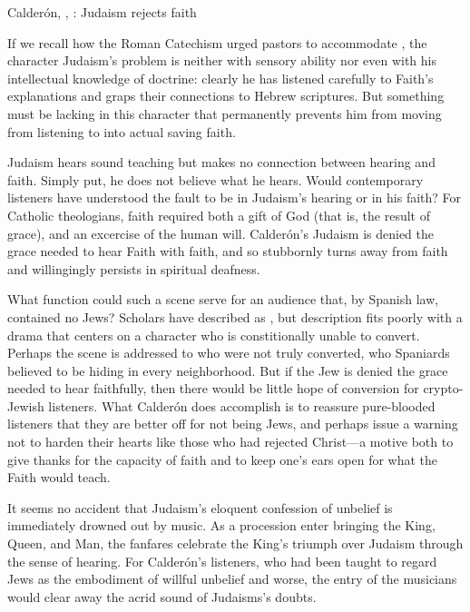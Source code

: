 \begin{expoem}
\caption{Calderón, , : Judaism rejects faith}
\label{expoem:Calderon-Retiro-Judaismo}
\end{expoem}

If we recall how the Roman Catechism urged pastors to accommodate , the character Judaism's problem is neither with sensory ability nor even with his intellectual knowledge of doctrine: clearly he has listened carefully to Faith's explanations and graps their connections to Hebrew scriptures.
But something must be lacking in this character that permanently prevents him from moving from listening to  into actual saving faith.

Judaism hears sound teaching but makes no connection between hearing and faith. 
Simply put, he does not believe what he hears.
Would contemporary listeners have understood the fault to be in Judaism's hearing or in his faith?
For Catholic theologians, faith required both a gift of God (that is, the result of grace), and an excercise of the human will.\citXXX{}
Calderón's Judaism is denied the grace needed to hear Faith with faith, and so stubbornly turns away from faith and willingingly persists in spiritual deafness.

What function could such a scene serve for an audience that, by Spanish law, contained no Jews?
Scholars have described  as \citXXX[Wardropper?], but description fits poorly with a drama that centers on a character who is constitionally unable to convert.
Perhaps the scene is addressed to  who were not truly converted, who Spaniards believed to be hiding in every neighborhood.
But if the Jew is denied the grace needed to hear faithfully, then there would be little hope of conversion for crypto-Jewish listeners.
What Calderón does accomplish is to reassure pure-blooded listeners that they are better off for not being Jews, and perhaps issue a warning not to harden their hearts like those who had rejected Christ---a motive both to give thanks for the capacity of faith and to keep one's ears open for what the Faith would teach.

It seems no accident that Judaism's eloquent confession of unbelief is immediately drowned out by music.
As a procession enter bringing the King, Queen, and Man, the fanfares  celebrate the King's triumph over Judaism through the sense of hearing.
For Calderón's listeners, who had been taught to regard Jews as the embodiment of willful unbelief and worse, the entry of the musicians would clear away the acrid sound of Judaisms's doubts.

